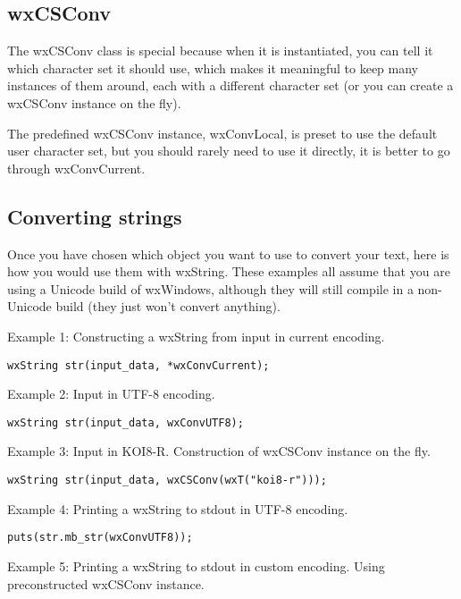 \subsection{wxCSConv}

The wxCSConv class is special because when it is instantiated, you can tell it
which character set it should use, which makes it meaningful to keep many
instances of them around, each with a different character set (or you can
create a wxCSConv instance on the fly).

The predefined wxCSConv instance, wxConvLocal, is preset to use the
default user character set, but you should rarely need to use it directly,
it is better to go through wxConvCurrent.

\subsection{Converting strings}

Once you have chosen which object you want to use to convert your text,
here is how you would use them with wxString. These examples all assume
that you are using a Unicode build of wxWindows, although they will still
compile in a non-Unicode build (they just won't convert anything).

Example 1: Constructing a wxString from input in current encoding.

\begin{verbatim}
wxString str(input_data, *wxConvCurrent);
\end{verbatim}

Example 2: Input in UTF-8 encoding.

\begin{verbatim}
wxString str(input_data, wxConvUTF8);
\end{verbatim}

Example 3: Input in KOI8-R. Construction of wxCSConv instance on the fly.

\begin{verbatim}
wxString str(input_data, wxCSConv(wxT("koi8-r")));
\end{verbatim}

Example 4: Printing a wxString to stdout in UTF-8 encoding.

\begin{verbatim}
puts(str.mb_str(wxConvUTF8));
\end{verbatim}

Example 5: Printing a wxString to stdout in custom encoding.
Using preconstructed wxCSConv instance.

